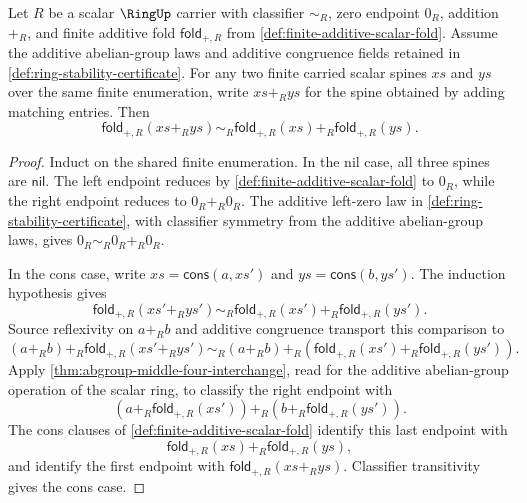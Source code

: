 \begin{lemma}
\label{lem:finite-additive-fold-separates-pointwise-scalar-sums}
Let $R$ be a scalar $\RingUp$ carrier with classifier $\sim_R$, zero endpoint $0_R$, addition $+_R$, and finite additive fold $\mathsf{fold}_{+,R}$ from \autoref{def:finite-additive-scalar-fold}. Assume the additive abelian-group laws and additive congruence fields retained in \autoref{def:ring-stability-certificate}. For any two finite carried scalar spines $xs$ and $ys$ over the same finite enumeration, write $xs+_Rys$ for the spine obtained by adding matching entries. Then
$$
\mathsf{fold}_{+,R}(xs+_Rys)\sim_R
\mathsf{fold}_{+,R}(xs)+_R\mathsf{fold}_{+,R}(ys).
$$
\end{lemma}
\begin{proof}
Induct on the shared finite enumeration. In the nil case, all three spines are $\mathsf{nil}$. The left endpoint reduces by \autoref{def:finite-additive-scalar-fold} to $0_R$, while the right endpoint reduces to $0_R+_R0_R$. The additive left-zero law in \autoref{def:ring-stability-certificate}, with classifier symmetry from the additive abelian-group laws, gives $0_R\sim_R0_R+_R0_R$.

In the cons case, write $xs=\mathsf{cons}(a,xs')$ and $ys=\mathsf{cons}(b,ys')$. The induction hypothesis gives
$$
\mathsf{fold}_{+,R}(xs'+_Rys')\sim_R
\mathsf{fold}_{+,R}(xs')+_R\mathsf{fold}_{+,R}(ys').
$$
Source reflexivity on $a+_Rb$ and additive congruence transport this comparison to
$$
(a+_Rb)+_R\mathsf{fold}_{+,R}(xs'+_Rys')
\sim_R
(a+_Rb)+_R(\mathsf{fold}_{+,R}(xs')+_R\mathsf{fold}_{+,R}(ys')).
$$
Apply \autoref{thm:abgroup-middle-four-interchange}, read for the additive abelian-group operation of the scalar ring, to classify the right endpoint with
$$
(a+_R\mathsf{fold}_{+,R}(xs'))+_R(b+_R\mathsf{fold}_{+,R}(ys')).
$$
The cons clauses of \autoref{def:finite-additive-scalar-fold} identify this last endpoint with
$$
\mathsf{fold}_{+,R}(xs)+_R\mathsf{fold}_{+,R}(ys),
$$
and identify the first endpoint with $\mathsf{fold}_{+,R}(xs+_Rys)$. Classifier transitivity gives the cons case.
\end{proof}

